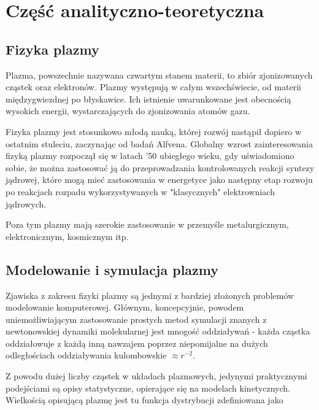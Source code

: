 \section[Część analityczno-teoretyczna]{Część analityczno-teoretyczna} %

\subsection{Fizyka plazmy}

Plazma, powszechnie nazywana czwartym stanem materii, to zbiór zjonizowanych %
cząstek oraz elektronów. Plazmy występują w całym wszechświecie, od materii międzygwiezdnej po błyskawice.
Ich istnienie uwarunkowane jest obecnością wysokich energii, wystarczających do zjonizowania atomów gazu.

Fizyka plazmy jest stosunkowo młodą nauką, której rozwój nastąpił dopiero w ostatnim stuleciu, zaczynając od badań Alfvena. %
Globalny wzrost zainteresowania fizyką plazmy rozpoczął się w latach '50 ubiegłego wieku, %
gdy uświadomiono sobie, że można zastosować ją do przeprowadzania kontrolowanych reakcji syntezy jądrowej, %
które mogą mieć zastosowania w energetyce jako następny etap rozwoju po reakcjach rozpadu wykorzystywanych
w "klasycznych" elektrowniach jądrowych.

Poza tym plazmy mają szerokie zastosowanie w przemyśle metalurgicznym, elektronicznym, kosmicznym itp. %

\subsection{Modelowanie i symulacja plazmy}

Zjawiska z zakresu fizyki plazmy są jednymi z bardziej złożonych problemów modelowanie komputerowej.
Głównym, koncepcyjnie, powodem uniemożliwiającym zastosowanie prostych metod symulacji
znanych z newtonowskiej dynamiki molekularnej jest mnogość oddziaływań - każda cząstka oddziałowuje
z każdą inną nawzajem poprzez niepomijalne na dużych odległościach oddziaływania kulombowskie $\approx r^{-2}$.

Z powodu dużej liczby cząstek w układach plazmowych, jedynymi praktycznymi podejściami są opisy statystyczne,
opierające się na modelach kinetycznych. Wielkością opisującą plazmę jest tu funkcja dystrybucji zdefiniowana jako


